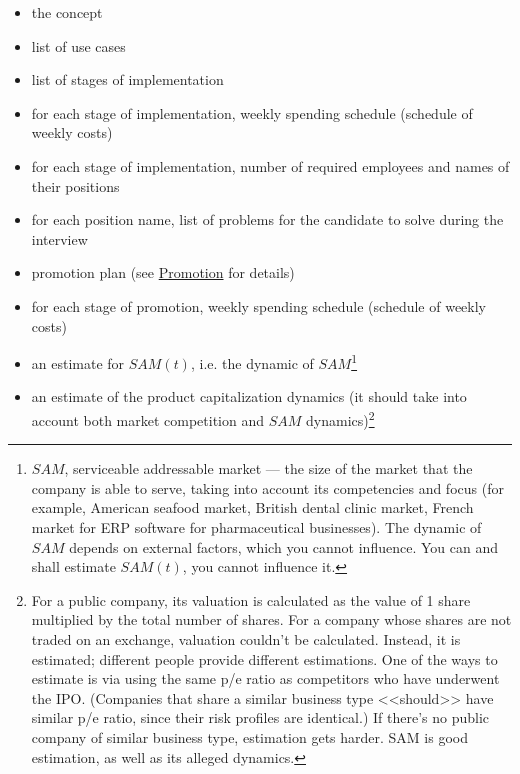 \documentclass[11pt]{article}
\theoremstyle{remark}
\theoremstyle{definition}
\begin{document}
\begin{itemize}

\item the concept 

\item list of use cases

\item list of stages of implementation

\item for each stage of implementation, weekly spending schedule (schedule of weekly costs)

\item for each stage of implementation, number of required employees and names of their positions

\item for each position name, list of problems for the candidate to solve during the interview

\item promotion plan (see \href{https://garkoosha.org/misc/promotion.pdf}{Promotion} for details)

\item for each stage of promotion, weekly spending schedule (schedule of weekly costs)

\item an estimate for $SAM (t)$, i.e. the dynamic of $SAM$\footnote{$SAM$, serviceable addressable market --- the size of the market that the company is able to serve, taking into account its competencies and focus (for example, American seafood market, British dental clinic market, French market for ERP software for pharmaceutical businesses). The dynamic of $SAM$ depends on external factors, which you cannot influence. You can and shall estimate $SAM(t)$, you cannot influence it.}

\item an estimate of the product capitalization dynamics (it should take into account both market competition and $SAM$ dynamics)\footnote{For a public company, its valuation is calculated as the value of 1 share multiplied by the total number of shares. For a company whose shares are not traded on an exchange, valuation couldn't be calculated. Instead, it is estimated; different people provide different estimations. One of the ways to estimate is via using the same p/e ratio as competitors who have underwent the IPO. (Companies that share a similar business type <<should>> have similar p/e ratio, since their risk profiles are identical.) If there's no public company of similar business type, estimation gets harder. SAM is good estimation, as well as its alleged dynamics.}


\end{itemize}
\end{document}
